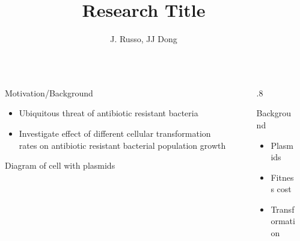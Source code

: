 \documentclass[final]{beamer}
\title{Research Title} %
\author{J. Russo, JJ Dong} %
\institute{Bucknell University, Department of Physics and Astronomy} %
\newlength{\sepwid}
\newlength{\onecolwid}
\begin{document}

\setlength{\belowcaptionskip}{2ex} %
\setlength\belowdisplayshortskip{2ex} %




\begin{frame}[t] %

\begin{block}

\begin{columns}[t] %
\begin{column}{4ex}\end{column} %

\begin{column}{\onecolwid}

  \begin{alertblock}{Motivation/Background}
  \begin{itemize}
    \item Ubiquitous threat of antibiotic resistant bacteria
    \item Investigate effect of different cellular transformation rates on antibiotic
    resistant bacterial population growth
  \end{itemize}

  \begin{center}
    Diagram of cell with plasmids
  \end{center}
  \end{alertblock}
\end{column}

\begin{column}{\sepwid}\end{column} %

\begin{column}{.8\onecolwid}
  \begin{alertblock}{Background}
    \begin{itemize}
      \item Plasmids
      \item Fitness cost
      \item Transformation
    \end{itemize}
  \end{alertblock}
\end{column}


\end{columns}
\end{block}
\end{frame}
\end{document}
